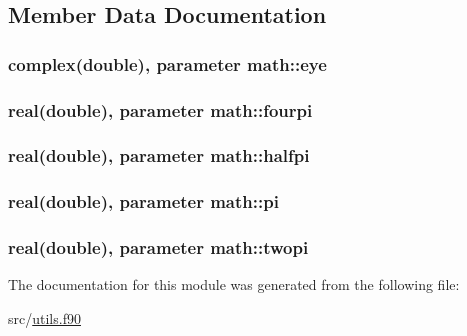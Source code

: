\subsection{Member Data Documentation}
\hypertarget{classmath_ae0354610846d49064ea0336f19d5bf3f}{
\subsubsection[{eye}]{\setlength{\rightskip}{0pt plus 5cm}complex(double), parameter math\-::eye}}\label{classmath_ae0354610846d49064ea0336f19d5bf3f}
\hypertarget{classmath_a83cddb754967ada1a15217d10ed9c24b}{
\subsubsection[{fourpi}]{\setlength{\rightskip}{0pt plus 5cm}real(double), parameter math\-::fourpi}}\label{classmath_a83cddb754967ada1a15217d10ed9c24b}
\hypertarget{classmath_a99d72d3bce2cadc8630d10ee09aaa3ea}{
\subsubsection[{halfpi}]{\setlength{\rightskip}{0pt plus 5cm}real(double), parameter math\-::halfpi}}\label{classmath_a99d72d3bce2cadc8630d10ee09aaa3ea}
\hypertarget{classmath_aa2f838077707f6cdb0c8a0ec69719690}{
\subsubsection[{pi}]{\setlength{\rightskip}{0pt plus 5cm}real(double), parameter math\-::pi}}\label{classmath_aa2f838077707f6cdb0c8a0ec69719690}
\hypertarget{classmath_aeb6d7ed6a20444e26f024b34eaa4c4f7}{
\subsubsection[{twopi}]{\setlength{\rightskip}{0pt plus 5cm}real(double), parameter math\-::twopi}}\label{classmath_aeb6d7ed6a20444e26f024b34eaa4c4f7}


The documentation for this module was generated from the following file\-:\begin{DoxyCompactItemize}
\item 
src/\hyperlink{utils_8f90}{utils.\-f90}\end{DoxyCompactItemize}
